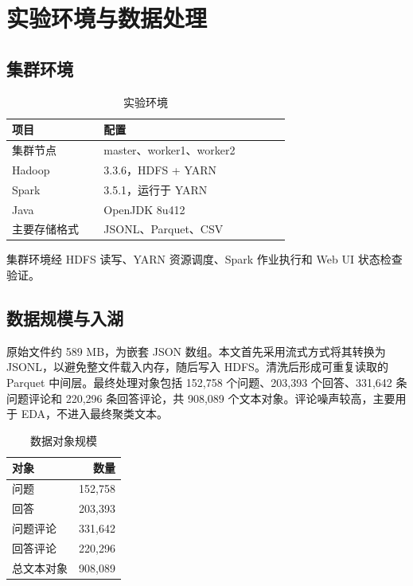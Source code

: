 \documentclass[a4paper,UTF8,zihao=5,fontset=windows]{ctexart}
\begin{document}
\section{实验环境与数据处理}

\subsection{集群环境}

\begin{table}[H]
\centering
\caption{实验环境}
\begin{tabular}{p{0.28\linewidth}p{0.58\linewidth}}
\toprule
项目 & 配置 \\
\midrule
集群节点 & master、worker1、worker2 \\
Hadoop & 3.3.6，HDFS + YARN \\
Spark & 3.5.1，运行于 YARN \\
Java & OpenJDK 8u412 \\
主要存储格式 & JSONL、Parquet、CSV \\
\bottomrule
\end{tabular}
\end{table}

集群环境经 HDFS 读写、YARN 资源调度、Spark 作业执行和 Web UI 状态检查验证。

\subsection{数据规模与入湖}

原始文件约 589 MB，为嵌套 JSON 数组。本文首先采用流式方式将其转换为 JSONL，以避免整文件载入内存，随后写入 HDFS。清洗后形成可重复读取的 Parquet 中间层。最终处理对象包括 152,758 个问题、203,393 个回答、331,642 条问题评论和 220,296 条回答评论，共 908,089 个文本对象。评论噪声较高，主要用于 EDA，不进入最终聚类文本。

\begin{table}[H]
\centering
\caption{数据对象规模}
\begin{tabular}{lr}
\toprule
对象 & 数量 \\
\midrule
问题 & 152,758 \\
回答 & 203,393 \\
问题评论 & 331,642 \\
回答评论 & 220,296 \\
总文本对象 & 908,089 \\
\bottomrule
\end{tabular}
\end{table}
\end{document}
